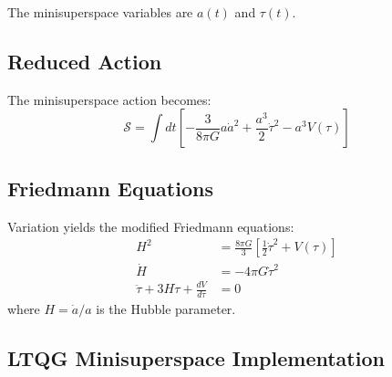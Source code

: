 \documentclass[11pt,a4paper]{article}
\theoremstyle{definition}
\theoremstyle{remark}
\newcommand{\action}{\mathcal{S}}
\begin{document}
The minisuperspace variables are $a(t)$ and $\tau(t)$.

\subsection{Reduced Action}

The minisuperspace action becomes:
\begin{equation}
\action = \int dt \left[ -\frac{3}{8\pi G} a \dot{a}^2 + \frac{a^3}{2} \dot{\tau}^2 - a^3 V(\tau) \right]
\end{equation}

\subsection{Friedmann Equations}

Variation yields the modified Friedmann equations:
\begin{align}
H^2 &= \frac{8\pi G}{3} \left[ \frac{1}{2}\dot{\tau}^2 + V(\tau) \right] \label{eq:friedmann1}\\
\dot{H} &= -4\pi G \dot{\tau}^2 \label{eq:friedmann2}\\
\ddot{\tau} + 3H\dot{\tau} + \frac{dV}{d\tau} &= 0 \label{eq:scalar_cosmo}
\end{align}
where $H = \dot{a}/a$ is the Hubble parameter.

\subsection{LTQG Minisuperspace Implementation}
\end{document}
